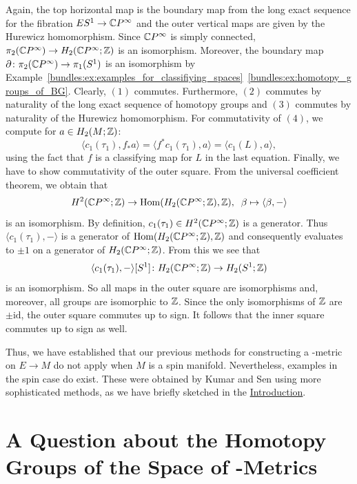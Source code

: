 Again, the top horizontal map is the boundary map from the long exact sequence for the fibration $ES^1 \to \mathbb{C} P^\infty$ and the outer vertical maps are given by the Hurewicz homomorphism. Since $\mathbb{C} P^\infty$ is simply connected, $\pi_2(\mathbb{C} P^\infty) \to H_2(\mathbb{C} P^\infty;\mathbb{Z})$ is an isomorphism. Moreover, the boundary map $\partial \colon \pi_2(\mathbb{C} P^\infty) \to \pi_1(S^1)$ is an isomorphism by Example~\ref{bundles:ex:examples_for_classifiying_spaces}~\ref{bundles:ex:homotopy_groups_of_BG}. Clearly, $(1)$ commutes. Furthermore, $(2)$ commutes by naturality of the long exact sequence of homotopy groups and $(3)$ commutes by naturality of the Hurewicz homomorphism. For commutativity of $(4)$, we compute for $a \in H_2(M;\mathbb{Z})$:
\[
\langle c_1(\tau_1),f_\ast a \rangle = \langle f^\ast c_1(\tau_1),a \rangle = \langle c_1(L),a \rangle,
\]
using the fact that $f$ is a classifying map for $L$ in the last equation. Finally, we have to show commutativity of the outer square. From the universal coefficient theorem, we obtain that 
\[
H^2(\mathbb{C} P^\infty;\mathbb{Z}) \to \mathrm{Hom}(H_2(\mathbb{C} P^\infty;\mathbb{Z}),\mathbb{Z}), \;\; \beta \mapsto \langle \beta, - \rangle 
\]
is an isomorphism. By definition, $c_1(\tau_1) \in H^2(\mathbb{C} P^\infty;\mathbb{Z})$ is a generator. Thus $\langle c_1(\tau_1), - \rangle $ is a generator of $\mathrm{Hom}(H_2(\mathbb{C} P^\infty;\mathbb{Z}),\mathbb{Z})$ and consequently evaluates to $\pm 1$ on a generator of $H_2(\mathbb{C} P^\infty;\mathbb{Z})$. From this we see that
\[
\langle c_1(\tau_1), - \rangle [S^1] \colon H_2(\mathbb{C} P^\infty;\mathbb{Z}) \to H_2(S^1;\mathbb{Z})
\]
is an isomorphism. So all maps in the outer square are isomorphisms and, moreover, all groups are isomorphic to $\mathbb{Z}$. Since the only isomorphisms of $\mathbb{Z}$ are $\pm \mathrm{id}$, the outer square commutes up to sign. It follows that the inner square commutes up to sign as well. 

Thus, we have established that our previous methods for constructing a \psc-metric on $E \to M$ do not apply when $M$ is a spin manifold. Nevertheless, examples in the spin case do exist. These were obtained by Kumar and Sen \cite{kumar2025circle} using more sophisticated methods, as we have briefly sketched in the \hyperref[chapter:intro]{Introduction}.

\section{A Question about the Homotopy Groups of the Space of \psc-Metrics}

